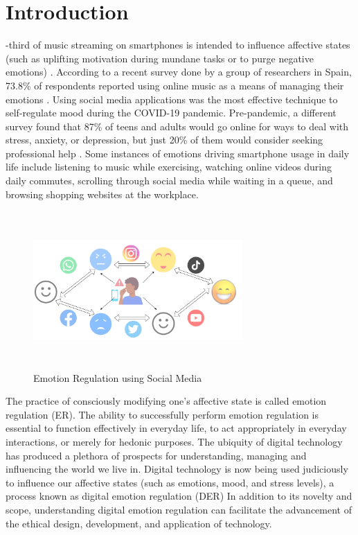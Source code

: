 \documentclass[lettersize,journal]{IEEEtran}
\begin{document}
\section{Introduction}
-third of music streaming on smartphones is intended to influence affective states (such as uplifting motivation during mundane tasks or to purge negative emotions) \cite{wadley2019use}. According to a recent survey done by a group of researchers in Spain, 73.8\% of respondents reported using online music as a means of managing their emotions \cite{martin2021music}. Using social media applications was the most effective technique to self-regulate mood during the COVID-19 pandemic. Pre-pandemic, a different survey found that 87\% of teens and adults would go online for ways to deal with stress, anxiety, or depression, but just 20\% of them would consider seeking professional help \cite{rideout2018digital}. Some instances of emotions driving smartphone usage in daily life include listening to music while exercising, watching online videos during daily commutes, scrolling through social media while waiting in a queue, and browsing shopping websites at the workplace.

\begin{figure}[h]
  
    \centering
    \includegraphics[width=8cm,height=6cm,keepaspectratio]{DER.png}
  \caption{Emotion Regulation using Social Media}
  \label{fig:SMER}
  \end{figure}
The practice of consciously modifying one's affective state is called emotion regulation (ER). The ability to successfully perform emotion regulation is essential to function effectively in everyday life, to act appropriately in everyday interactions, or merely for hedonic purposes. The ubiquity of digital technology has produced a plethora of prospects for understanding, managing and influencing the world we live in. Digital technology is now being used judiciously to influence our affective states (such as emotions, mood, and stress levels), a process known as digital emotion regulation (DER) In addition to its novelty and scope, understanding digital emotion regulation can facilitate the advancement of the ethical design, development, and application of technology.
\end{document}
